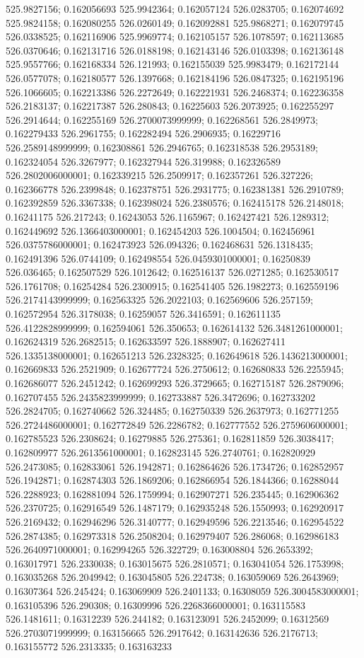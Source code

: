 525.9827156; 0.162056693 525.9942364; 0.162057124 526.0283705; 0.162074692 525.9824158; 0.162080255 526.0260149; 0.162092881 525.9868271; 0.162079745 526.0338525; 0.162116906 525.9969774; 0.162105157 526.1078597; 0.162113685 526.0370646; 0.162131716 526.0188198; 0.162143146 526.0103398; 0.162136148 525.9557766; 0.162168334 526.121993; 0.162155039 525.9983479; 0.162172144 526.0577078; 0.162180577 526.1397668; 0.162184196 526.0847325; 0.162195196 526.1066605; 0.162213386 526.2272649; 0.162221931 526.2468374; 0.162236358 526.2183137; 0.162217387 526.280843; 0.16225603 526.2073925; 0.162255297 526.2914644; 0.162255169 526.2700073999999; 0.162268561 526.2849973; 0.162279433 526.2961755; 0.162282494 526.2906935; 0.16229716 526.2589148999999; 0.162308861 526.2946765; 0.162318538 526.2953189; 0.162324054 526.3267977; 0.162327944 526.319988; 0.162326589 526.2802006000001; 0.162339215 526.2509917; 0.162357261 526.327226; 0.162366778 526.2399848; 0.162378751 526.2931775; 0.162381381 526.2910789; 0.162392859 526.3367338; 0.162398024 526.2380576; 0.162415178 526.2148018; 0.16241175 526.217243; 0.16243053 526.1165967; 0.162427421 526.1289312; 0.162449692 526.1366403000001; 0.162454203 526.1004504; 0.162456961 526.0375786000001; 0.162473923 526.094326; 0.162468631 526.1318435; 0.162491396 526.0744109; 0.162498554 526.0459301000001; 0.16250839 526.036465; 0.162507529 526.1012642; 0.162516137 526.0271285; 0.162530517 526.1761708; 0.16254284 526.2300915; 0.162541405 526.1982273; 0.162559196 526.2174143999999; 0.162563325 526.2022103; 0.162569606 526.257159; 0.162572954 526.3178038; 0.16259057 526.3416591; 0.162611135 526.4122828999999; 0.162594061 526.350653; 0.162614132 526.3481261000001; 0.162624319 526.2682515; 0.162633597 526.1888907; 0.162627411 526.1335138000001; 0.162651213 526.2328325; 0.162649618 526.1436213000001; 0.162669833 526.2521909; 0.162677724 526.2750612; 0.162680833 526.2255945; 0.162686077 526.2451242; 0.162699293 526.3729665; 0.162715187 526.2879096; 0.162707455 526.2435823999999; 0.162733887 526.3472696; 0.162733202 526.2824705; 0.162740662 526.324485; 0.162750339 526.2637973; 0.162771255 526.2724486000001; 0.162772849 526.2286782; 0.162777552 526.2759606000001; 0.162785523 526.2308624; 0.16279885 526.275361; 0.162811859 526.3038417; 0.162809977 526.2613561000001; 0.162823145 526.2740761; 0.162820929 526.2473085; 0.162833061 526.1942871; 0.162864626 526.1734726; 0.162852957 526.1942871; 0.162874303 526.1869206; 0.162866954 526.1844366; 0.16288044 526.2288923; 0.162881094 526.1759994; 0.162907271 526.235445; 0.162906362 526.2370725; 0.162916549 526.1487179; 0.162935248 526.1550993; 0.162920917 526.2169432; 0.162946296 526.3140777; 0.162949596 526.2213546; 0.162954522 526.2874385; 0.162973318 526.2508204; 0.162979407 526.286068; 0.162986183 526.2640971000001; 0.162994265 526.322729; 0.163008804 526.2653392; 0.163017971 526.2330038; 0.163015675 526.2810571; 0.163041054 526.1753998; 0.163035268 526.2049942; 0.163045805 526.224738; 0.163059069 526.2643969; 0.16307364 526.245424; 0.163069909 526.2401133; 0.16308059 526.3004583000001; 0.163105396 526.290308; 0.16309996 526.2268366000001; 0.163115583 526.1481611; 0.16312239 526.244182; 0.163123091 526.2452099; 0.16312569 526.2703071999999; 0.163156665 526.2917642; 0.163142636 526.2176713; 0.163155772 526.2313335; 0.163163233 
